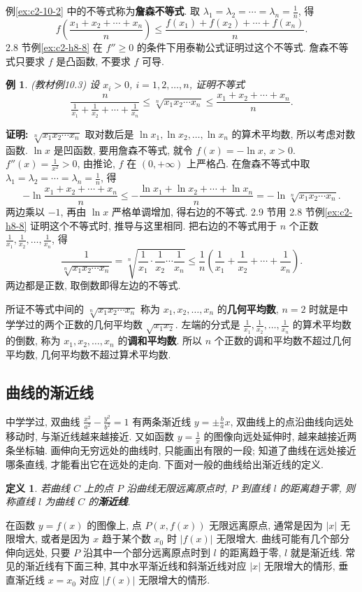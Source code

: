 \documentclass[UTF8,openany]{ctexbook}
\theoremstyle{chinesetextbook}
\newtheorem{definition}{定义}[section]
\newtheorem{example}{例}[section]
\newenvironment{cnproof}{\par\indent\textbf{证明:} \ignorespaces}{\par}
\begin{document}
例\ref{ex:c2-10-2} 中的不等式称为\textbf{詹森不等式}. 取 $\displaystyle\lambda_1=\lambda_2=\cdots=\lambda_n=\frac1n$, 得
\[
f\left(\frac{x_1+x_2+\cdots+x_n}n\right)\le\frac{f(x_1)+f(x_2)+\cdots+f(x_n)}n.
\]
2.8 节例\ref{ex:c2-h8-8} 在 $f''\ge0$ 的条件下用泰勒公式证明过这个不等式. 詹森不等式只要求 $f$ 是凸函数, 不要求 $f$ 可导.
\begin{example}\label{ex:c2-10-3}
\textnormal{(教材例10.3)} 设 $x_i>0$, $i=1,2,\ldots,n$, 证明不等式
\[
\frac n{\frac1{x_1}+\frac1{x_2}+\cdots+\frac1{x_n}}\le\sqrt[n]{x_1x_2\cdots x_n}\le\frac{x_1+x_2+\cdots+x_n}n.
\]
\end{example}
\begin{cnproof}
$\sqrt[n]{x_1x_2\cdots x_n}$ 取对数后是 $\ln x_1,\ln x_2,\ldots,\ln x_n$ 的算术平均数, 所以考虑对数函数. $\ln x$ 是凹函数, 要用詹森不等式, 就令 $f(x)=-\ln x$, $x>0$. $\displaystyle f''(x)=\frac1{x^2}>0$, 由推论, $f$ 在 $(0,+\infty)$ 上严格凸. 在詹森不等式中取 $\displaystyle\lambda_1=\lambda_2=\cdots=\lambda_n=\frac1n$, 得
\[
-\ln\frac{x_1+x_2+\cdots+x_n}n\le-\frac{\ln x_1+\ln x_2+\cdots+\ln x_n}n=-\ln\sqrt[n]{x_1x_2\cdots x_n}.
\]
两边乘以 $-1$, 再由 $\ln x$ 严格单调增加, 得右边的不等式. 2.9 节用 2.8 节例\ref{ex:c2-h8-8} 证明这个不等式时, 推导与这里相同. 把右边的不等式用于 $n$ 个正数 $\displaystyle\frac1{x_1},\frac1{x_2},\ldots,\frac1{x_n}$, 得
\[
\frac1{\sqrt[n]{x_1x_2\cdots x_n}}=\sqrt[n]{\frac1{x_1}\cdot\frac1{x_2}\cdots\frac1{x_n}}\le\frac1n\left(\frac1{x_1}+\frac1{x_2}+\cdots+\frac1{x_n}\right).
\]
两边都是正数, 取倒数即得左边的不等式.
\end{cnproof}
所证不等式中间的 $\sqrt[n]{x_1x_2\cdots x_n}$ 称为 $x_1,x_2,\ldots,x_n$ 的\textbf{几何平均数}, $n=2$ 时就是中学学过的两个正数的几何平均数 $\sqrt{x_1x_2}$. 左端的分式是 $\displaystyle\frac1{x_1},\frac1{x_2},\ldots,\frac1{x_n}$ 的算术平均数的倒数, 称为 $x_1,x_2,\ldots,x_n$ 的\textbf{调和平均数}. 所以 $n$ 个正数的调和平均数不超过几何平均数, 几何平均数不超过算术平均数.
\subsection{曲线的渐近线}
中学学过, 双曲线 $\displaystyle\frac{x^2}{a^2}-\frac{y^2}{b^2}=1$ 有两条渐近线 $\displaystyle y=\pm\frac bax$, 双曲线上的点沿曲线向远处移动时, 与渐近线越来越接近. 又如函数 $\displaystyle y=\frac1x$ 的图像向远处延伸时, 越来越接近两条坐标轴. 画伸向无穷远处的曲线时, 只能画出有限的一段; 知道了曲线在远处接近哪条直线, 才能看出它在远处的走向. 下面对一般的曲线给出渐近线的定义.
\begin{definition}\label{def:c2-10-asymptote}
若曲线 $C$ 上的点 $P$ 沿曲线无限远离原点时, $P$ 到直线 $l$ 的距离趋于零, 则称直线 $l$ 为曲线 $C$ 的\textbf{渐近线}.
\end{definition}
在函数 $y=f(x)$ 的图像上, 点 $P(x,f(x))$ 无限远离原点, 通常是因为 $|x|$ 无限增大, 或者是因为 $x$ 趋于某个数 $x_0$ 时 $|f(x)|$ 无限增大. 曲线可能有几个部分伸向远处, 只要 $P$ 沿其中一个部分远离原点时到 $l$ 的距离趋于零, $l$ 就是渐近线. 常见的渐近线有下面三种, 其中水平渐近线和斜渐近线对应 $|x|$ 无限增大的情形, 垂直渐近线 $x=x_0$ 对应 $|f(x)|$ 无限增大的情形.
\end{document}
